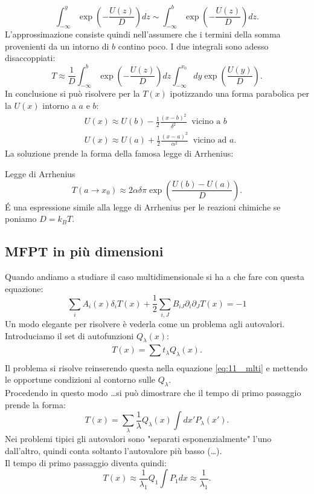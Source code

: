 \[
 \int_{-\infty}^{y} \exp\left(-\frac{U(z)}{D}\right)dz \sim \int_{-\infty}^{b} \exp\left(-\frac{U(z)}{D}\right)dz   
.\] 
L'approssimazione consiste quindi nell'assumere che i termini della somma provenienti da un intorno di $b$ contino poco. I due integrali sono adesso disaccoppiati:
\[
    T \approx \frac{1}{D}\int_{-\infty}^{b}\exp\left(-\frac{U(z)}{D}\right)dz \int_{-\infty}^{x_0} dy \exp\left(\frac{U(y)}{D}\right)
.\] 
In conclusione si può risolvere per la $T(x)$ ipotizzando una forma parabolica per la $U(x)$ intorno a $a$ e $b$:
\[\begin{aligned}
    &U(x)  \approx U(b) - \frac{1}{2} \frac{\left(x-b\right)^2}{\delta^2} \ \text{  vicino a } b\\
    &U(x)  \approx U(a) + \frac{1}{2} \frac{\left(x-a\right)^2}{\alpha^2} \ \text{  vicino ad } a
.\end{aligned}\]
La soluzione prende la forma della famosa legge di Arrhenius:
\begin{greenbox}{Legge di Arrhenius}
\[
    T(a\to x_0) \approx 2\alpha\delta\pi  \exp\left(\frac{U(b) - U(a) }{D}\right)
.\] 
\'E una espressione simile alla legge di Arrhenius per le reazioni chimiche se poniamo $D = k_BT$.
\end{greenbox}
\noindent
\subsection{MFPT in più dimensioni}%
\label{sub:MFPT in più dimensioni}
Quando andiamo a studiare il caso multidimensionale si ha a che fare con questa equazione:
\begin{equation}
    \sum_{i}^{} A_i(x) \delta_iT(x)+\frac{1}{2}\sum_{i,J}^{} B_{iJ}\partial_{i}\partial_{J}T(x) = -1
    \label{eq:11_ mlti}
\end{equation}
Un modo elegante per risolvere è vederla come un problema agli autovalori. \\
Introduciamo il set di autofunzioni $Q_\lambda (x)$:
\[
    T(x) = \sum_{}^{} t_\lambda Q_\lambda(x) 
.\] 
Il problema si risolve reinserendo questa nella equazione \ref{eq:11_ mlti} e mettendo le opportune condizioni al contorno sulle $Q_\lambda$.\\
Procedendo in questo modo \ldots si può dimostrare che il tempo di primo passaggio prende la forma:
\[
    T(x) = \sum_{\lambda}^{} \frac{1}{\lambda}Q_\lambda (x) \int dx' P_\lambda (x')  
.\] 
Nei problemi tipici gli autovalori sono "separati esponenzialmente" l'uno dall'altro, quindi conta soltanto l'autovalore più basso (\ldots).\\
Il tempo di primo passaggio diventa quindi:
\[
    T(x) \approx \frac{1}{\lambda_1}Q_1\int P_1dx \approx \frac{1}{\lambda_1}
.\] 
